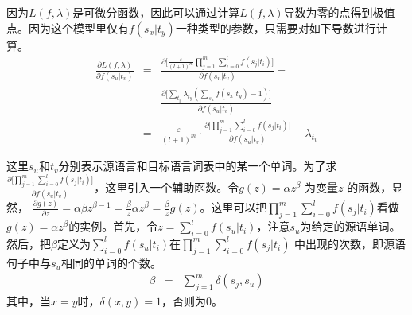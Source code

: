 \noindent 因为$L(f,\lambda)$是可微分函数，因此可以通过计算$L(f,\lambda)$导数为零的点得到极值点。因为这个模型里仅有$f(s_x|t_y)$一种类型的参数，只需要对如下导数进行计算。
\begin{eqnarray}
\frac{\partial L(f,\lambda)}{\partial f(s_u|t_v)}& = & \frac{\partial \big[ \frac{\varepsilon}{(l+1)^{m}} \prod\limits_{j=1}^{m} \sum\limits_{i=0}^{l} f(s_j|t_i) \big]}{\partial f(s_u|t_v)} - \nonumber \\
                                                                     &     & \frac{\partial \big[ \sum_{t_y} \lambda_{t_y} (\sum_{s_x} f(s_x|t_y) -1) \big]}{\partial f(s_u|t_v)} \nonumber \\
                                                                     & =  & \frac{\varepsilon}{(l+1)^{m}} \cdot \frac{\partial \big[ \prod\limits_{j=1}^{m} \sum\limits_{i=0}^{l} f(s_j|t_i) \big]}{\partial f(s_u|t_v)} - \lambda_{t_v}
\label{eq:5-31}
\end{eqnarray}

\noindent 这里$s_u$和$t_v$分别表示源语言和目标语言词表中的某一个单词。为了求$\frac{\partial \big[ \prod\limits_{j=1}^{m} \sum\limits_{i=0}^{l} f(s_j|t_i) \big]}{\partial f(s_u|t_v)}$，这里引入一个辅助函数。令$g(z)=\alpha z^{\beta}$ 为变量$z$ 的函数，显然，
$\frac{\partial g(z)}{\partial z} = \alpha \beta z^{\beta-1} = \frac{\beta}{z}\alpha z^{\beta} = \frac{\beta}{z} g(z)$。这里可以把$\prod_{j=1}^{m} \sum_{i=0}^{l} f(s_j|t_i)$看做$g(z)=\alpha z^{\beta}$的实例。首先，令$z=\sum_{i=0}^{l}f(s_u|t_i)$，注意$s_u$为给定的源语单词。然后，把$\beta$定义为$\sum_{i=0}^{l}f(s_u|t_i)$在$\prod_{j=1}^{m} \sum_{i=0}^{l} f(s_j|t_i)$ 中出现的次数，即源语句子中与$s_u$相同的单词的个数。
\vspace{-1em}
\begin{eqnarray}
\beta &=& \sum_{j=1}^{m} \delta(s_j,s_u)
\label{eq:5-32}
\end{eqnarray}
\noindent 其中，当$x=y$时，$\delta(x,y)=1$，否则为0。

